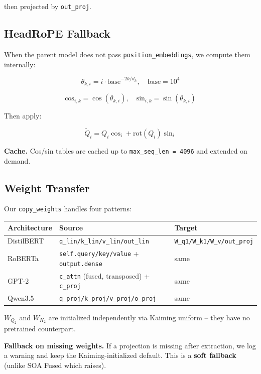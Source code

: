 then projected by \texttt{out\_proj}.

\subsection{HeadRoPE Fallback}

When the parent model does not pass \texttt{position\_embeddings}, we compute them 
internally:

\[
\theta_{k, i} = i \cdot \text{base}^{-2k/d_h}, \quad \text{base} = 10^4
\tag{4.12}
\]

\[
\text{cos}_{i, k} = \cos(\theta_{k, i}), \quad \text{sin}_{i, k} = \sin(\theta_{k, i})
\tag{4.13}
\]

Then apply:

\[
\tilde{Q}_i = Q_i \cos_i + \text{rot}(Q_i) \sin_i
\tag{4.14}
\]

\textbf{Cache.} Cos/sin tables are cached up to \texttt{max\_seq\_len = 4096} and extended 
on demand.

\subsection{Weight Transfer}

Our \texttt{copy\_weights} handles four patterns:

\begin{table}[H]
\centering
\small
\begin{tabular}{lll}
\toprule
\textbf{Architecture} & \textbf{Source} & \textbf{Target} \\
\midrule
DistilBERT & \texttt{q\_lin/k\_lin/v\_lin/out\_lin} & \texttt{W\_q1/W\_k1/W\_v/out\_proj} \\
RoBERTa & \texttt{self.query/key/value} + \texttt{output.dense} & same \\
GPT-2 & \texttt{c\_attn} (fused, transposed) + \texttt{c\_proj} & same \\
Qwen3.5 & \texttt{q\_proj/k\_proj/v\_proj/o\_proj} & same \\
\bottomrule
\end{tabular}
\end{table}

$W_{Q_2}$ and $W_{K_2}$ are initialized independently via Kaiming uniform -- 
they have no pretrained counterpart.

\textbf{Fallback on missing weights.} If a projection is missing after extraction, 
we log a warning and keep the Kaiming-initialized default. This is a 
\textbf{soft fallback} (unlike SOA Fused which raises).

